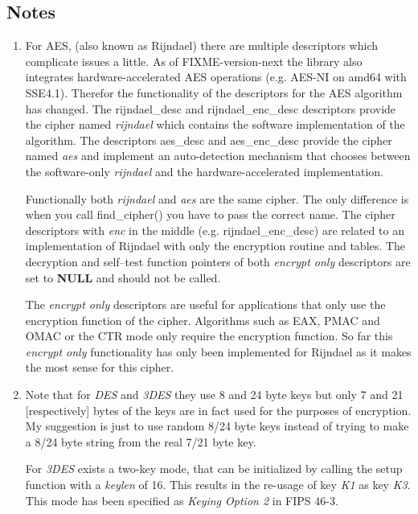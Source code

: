 \documentclass[synpaper]{book}
\begin{document}
\subsection{Notes}
\begin{small}
\begin{enumerate}
\item
For AES, (also known as Rijndael) there are multiple descriptors which complicate issues a little.  As of FIXME-version-next
the library also integrates hardware-accelerated AES operations (e.g. AES-NI on amd64 with SSE4.1).  Therefor the functionality of
the descriptors for the AES algorithm has changed.  The rijndael\_desc and rijndael\_enc\_desc descriptors provide the cipher
named \textit{rijndael} which contains the software implementation of the algorithm.  The descriptors aes\_desc and aes\_enc\_desc
provide the cipher named \textit{aes} and implement an auto-detection mechanism that chooses between the software-only \textit{rijndael}
and the hardware-accelerated implementation.

Functionally both \textit{rijndael} and \textit{aes} are the same cipher.  The
only difference is when you call find\_cipher() you have to pass the correct name.  The cipher descriptors with \textit{enc}
in the middle (e.g. rijndael\_enc\_desc) are related to an implementation of Rijndael with only the encryption routine
and tables.  The decryption and self--test function pointers of both \textit{encrypt only} descriptors are set to \textbf{NULL} and
should not be called.

The \textit{encrypt only} descriptors are useful for applications that only use the encryption function of the cipher.  Algorithms such
as EAX, PMAC and OMAC or the CTR mode only require the encryption function.  So far this \textit{encrypt only} functionality has only
been implemented for Rijndael as it makes the most sense for this cipher.

\item
Note that for \textit{DES} and \textit{3DES} they use 8 and 24 byte keys but only 7 and 21 [respectively] bytes of the keys are in
fact used for the purposes of encryption.  My suggestion is just to use random 8/24 byte keys instead of trying to make a 8/24
byte string from the real 7/21 byte key.

For \textit{3DES} exists a two-key mode, that can be initialized by calling the setup function with a \textit{keylen} of 16.
This results in the re-usage of key \textit{K1} as key \textit{K3}. This mode has been specified as \textit{Keying Option 2} in FIPS 46-3.


\end{enumerate}
\end{small}
\end{document}
